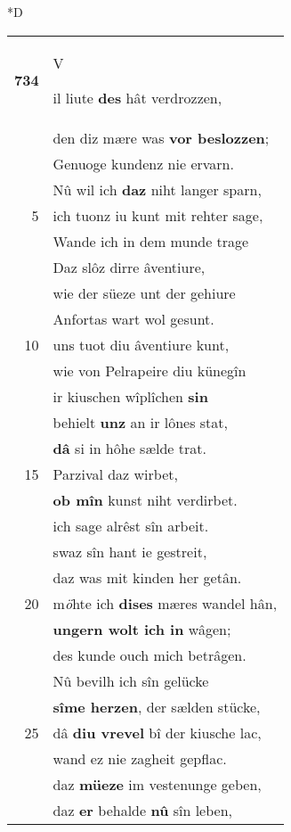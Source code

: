 \documentclass[8pt,a4paper,notitlepage]{article}
\begin{document}
\begin{table}[ht]
\begin{minipage}[t]{0.5\linewidth}
\small
\begin{center}*D
\end{center}
\begin{tabular}{rl}
\textbf{734} & \begin{large}V\end{large}il liute \textbf{des} hât verdrozzen,\\ 
 & den diz mære was \textbf{vor beslozzen};\\ 
 & Genuoge kundenz nie ervarn.\\ 
 & Nû wil ich \textbf{daz} niht langer sparn,\\ 
5 & ich tuonz iu kunt mit rehter sage,\\ 
 & Wande ich in dem munde trage\\ 
 & Daz slôz dirre âventiure,\\ 
 & wie der süeze unt der gehiure\\ 
 & Anfortas wart wol gesunt.\\ 
10 & uns tuot diu âventiure kunt,\\ 
 & wie von Pelrapeire diu künegîn\\ 
 & ir kiuschen wîplîchen \textbf{sin}\\ 
 & behielt \textbf{unz} an ir lônes stat,\\ 
 & \textbf{dâ} si in hôhe sælde trat.\\ 
15 & Parzival daz wirbet,\\ 
 & \textbf{ob mîn} kunst niht verdirbet.\\ 
 & ich sage alrêst sîn arbeit.\\ 
 & swaz sîn hant ie gestreit,\\ 
 & daz was mit kinden her getân.\\ 
20 & m\textit{ö}hte ich \textbf{dises} mæres wandel hân,\\ 
 & \textbf{ungern wolt ich in} wâgen;\\ 
 & des kunde ouch mich betrâgen.\\ 
 & Nû bevilh ich sîn gelücke\\ 
 & \textbf{sîme herzen}, der sælden stücke,\\ 
25 & dâ \textbf{diu vrevel} bî der kiusche lac,\\ 
 & wand ez nie zagheit gepflac.\\ 
 & daz \textbf{müeze} im vestenunge geben,\\ 
 & daz \textbf{er} behalde \textbf{nû} sîn leben,\\ 

\end{tabular}
\end{minipage}
\end{table}
\end{document}
